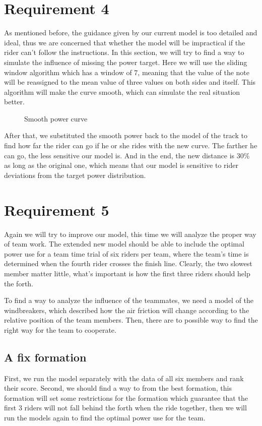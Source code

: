 \documentclass[12pt]{article}
\begin{document}
\section{Requirement 4}
As mentioned before, the guidance given by our current model is too detailed and ideal, thus we are concerned that whether the model will be impractical if the rider can't
follow the instructions. In this section, we will try to find a way to simulate the influence of missing the power target. Here we will use the sliding window algorithm which
has a window of 7, meaning that the value of the note will be reassigned to the mean value of three values on both sides and itself. This algorithm will make the curve smooth,
which can simulate the real situation better.
\begin{figure}
    \centering
    
    \caption{Smooth power curve}
\end{figure}

After that, we substituted the smooth power back to the model of the track to find how far the rider can go if he or she rides with the new curve. The farther he can go, the 
less sensitive our model is. And in the end, the new distance is 30\% as long as the original one, which means that our model is sensitive  to rider deviations from the target power
distribution.
\section{Requirement 5}
Again we will try to improve our model, this time we will analyze the proper way of team work. The extended new model should be able to  include the optimal power use for a team time trial of six riders per team, where the team's time is
determined when the fourth rider crosses the finish line. Clearly, the two slowest member matter little, what's important is how the first three riders should help the forth.

To find a way to analyze the influence of the teammates, we need a model of the windbreakers, which described how the air friction will change according to the relative
position of the team members. Then, there are to possible way to find the right way for the team to cooperate.
\subsection{A fix formation}
First, we run the model separately with the data of all six members and rank their score. Second, we should find a way to from the best formation, this formation will
 set some restrictions for the formation which guarantee that the first 3 riders will not fall behind the forth when the ride together, then we will run the models again to 
 find the optimal power use for the team.
\end{document}
